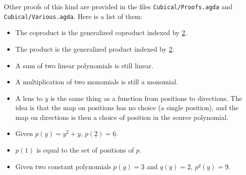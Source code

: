 Other proofs of this kind are provided in the files \texttt{Cubical/Proofs.agda} and 
\texttt{Cubical/Various.agda}. Here is a list of them:
\begin{itemize}
    \item The coproduct is the generalized coproduct indexed by \underline{2}.
    \item The product is the generalized product indexed by \underline{2}.
    \item A sum of two linear polynomials is still linear.
    \item A multiplication of two monomials is still a monomial.
    \item A lens to $y$ is the same thing as a function from positions to directions. The idea is that the map on positions has no choice (a single position), and the map on directions is then a choice of position in the source polynomial.
    \item Given $p(y) = y^2 + y$, $p(\underline{2}) = \underline{6}$.
    \item $p(1)$ is equal to the set of positions of $p$.
    \item Given two constant polynomials $p(y) = \underline{3}$ and $q(y) = \underline{2}$, $p^q(y) = \underline{9}$.
\end{itemize}
